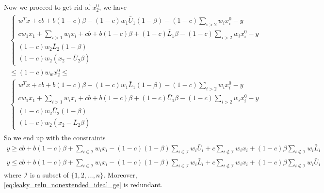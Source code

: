 \documentclass{article}
\begin{document}
Now we proceed to get rid of $x^0_2$, we have
\begin{align}
	\begin{split}
	\begin{cases}
		w^Tx + cb + b(1-c)\beta - (1-c)w_1\bar{U}_1(1-\beta) - (1-c)\sum_{i>2}w_ix^0_i - y\\
		cw_1x_1 + \sum_{i>1}w_ix_i + cb + b(1-c)\beta + (1-c)\bar{L}_1\beta - (1-c)\sum_{i>2}w_ix^0_i-y\\
		(1-c)w_2\bar{L}_2(1-\beta)\\
		(1-c)w_2(x_2-\bar{U}_2\beta)
	\end{cases}\\
	\le (1-c)w_wx^0_2\le\\
	\begin{cases}
		w^Tx + cb + b(1-c)\beta - (1-c)w_1\bar{L}_1(1-\beta) - (1-c)\sum_{i>2}w_ix^0_i - y\\
		cw_1x_1 + \sum_{i>1}w_ix_i+cb+b(1-c)\beta + (1-c)\bar{U}_1\beta - (1-c)\sum_{i>2}w_ix^0_i-y\\
		(1-c)w_2\bar{U}_2(1-\beta)\\
		(1-c)w_2(x_2-\bar{L}_2\beta)
	\end{cases}
\end{split}
\end{align}
So we end up with the constraints
\begin{subequations}
\begin{align}
	y\ge cb + b(1-c)\beta + \sum_{i\in\mathcal{I}}w_ix_i - (1-c)(1-\beta)\sum_{i\in\mathcal{I}}w_i\bar{U}_i + c\sum_{i\notin\mathcal{I}}w_ix_i + (1-c)\beta\sum_{i\notin\mathcal{I}}w_i\bar{L}_i \label{eq:leaky_relu_nonextended_ideal_ge}\\
	y \le cb + b(1-c)\beta + \sum_{i\in\mathcal{I}}w_ix_i -(1-c)(1-\beta)\sum_{i\in\mathcal{I}}w_i\bar{L}_i + c\sum_{i\notin\mathcal{I}}w_ix_i + (1-c)\beta\sum_{i\notin\mathcal{I}}w_i\bar{U}_i \label{eq:leaky_relu_nonextended_ideal_le}
\end{align}
\end{subequations}
where $\mathcal{I}$ is a subset of $\{1, 2, ..., n\}$. Moreover, \eqref{eq:leaky_relu_nonextended_ideal_ge} is redundant.
\end{document}
